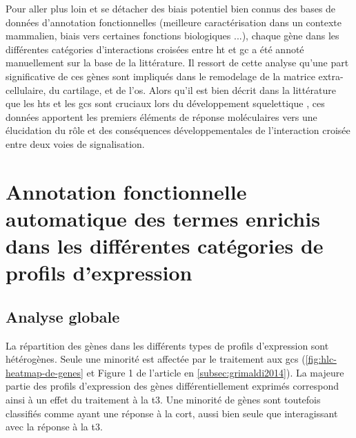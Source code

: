 \documentclass[../main.tex]{subfiles}
\begin{document}
	Pour aller plus loin et se détacher des biais potentiel bien connus des bases de données d'annotation fonctionnelles (meilleure caractérisation dans un contexte mammalien, biais vers certaines fonctions biologiques ...), chaque gène dans les différentes catégories d'interactions croisées entre \gls{ht} et \gls{gc} a été annoté manuellement sur la base de la littérature.
	Il ressort de cette analyse qu'une part significative de ces gènes sont impliqués dans le remodelage de la matrice extra-cellulaire, du cartilage, et de l'os.
	Alors qu'il est bien décrit dans la littérature que les \glspl{ht} et les \glspl{gc} sont cruciaux lors du développement squelettique \citep{Robson2002,Wojcicka2013a}, ces données apportent les premiers éléments de réponse moléculaires vers une élucidation du rôle et des conséquences développementales de l'interaction croisée entre deux voies de signalisation.




		
		
		





\section{Annotation fonctionnelle automatique des termes enrichis dans les différentes catégories de profils d'expression}\label{sec:hlc-preanalysis}


	\subsection{Analyse globale}
		La répartition des gènes dans les différents types de profils d'expression sont hétérogènes.
		Seule une minorité est affectée par le traitement aux \glspl{gc} (\autoref{fig:hlc-heatmap-de-genes} et Figure 1 de l'article en \autoref{subsec:grimaldi2014}).
		La majeure partie des profils d'expression des gènes différentiellement exprimés correspond ainsi à un effet du traitement à la \gls{t3}.
		Une minorité de gènes sont toutefois classifiés comme ayant une réponse à la \gls{cort}, aussi bien seule que interagissant avec la réponse à la \gls{t3}.
\end{document}
